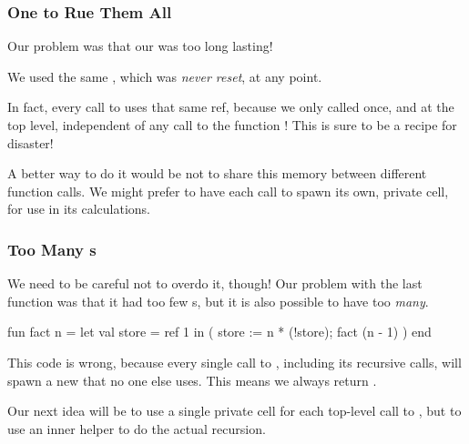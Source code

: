 \documentclass[aspectratio=169]{beamer}
\begin{document}
\begin{frame}[fragile]
  \frametitle{One  to Rue Them All}

  Our problem was that our  was too long lasting!

  \vspace{\fill}

  We used the same , which was \textit{never reset}, at any point.

  \pause
  \vspace{\fill}

  In fact, every call to  uses that same ref, because we only called
   once, and at the top level, independent of any call to the function
  ! This is sure to be a recipe for disaster!

  \pause
  \vspace{\fill}

  A better way to do it would be not to share this memory between different function
  calls. We might prefer to have each call to  spawn its own, private
   cell, for use in its calculations.
\end{frame}

\begin{frame}[fragile]
  \frametitle{Too Many s}

  We need to be careful not to overdo it, though! Our problem with the
  last function was that it had too few s, but it is also
  possible to have too \textit{many}.

  \pause
  \vspace{\fill}

  \begin{codeblock}
    fun fact n =
      let
        val store = ref 1
      in
        ( store := n * (!store);
          fact (n - 1)
        )
      end
  \end{codeblock}

  \pause
  \vspace{\fill}

  This code is wrong, because every single call to , including
  its recursive calls, will spawn a new  that no one else
  uses. This means we always return .

  \pause
  \vspace{\fill}

  Our next idea will be to use a single private  cell for each
  top-level call to , but to use an inner helper to do the
  actual recursion.
\end{frame}
\end{document}
